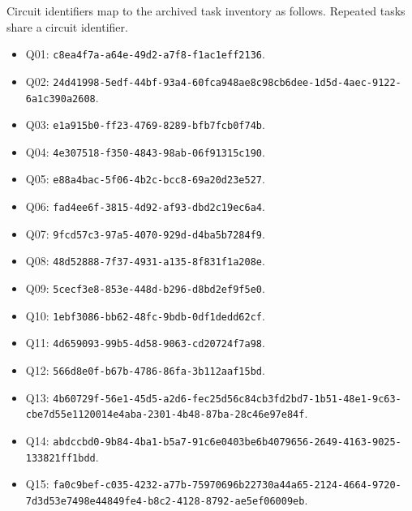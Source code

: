 Circuit identifiers map to the archived task inventory as follows. Repeated tasks share a circuit identifier.
\begin{itemize}

\item Q01: \texttt{c8ea4f7a-a64e-49d2-a7f8-f1ac1eff2136}.

\item Q02: \texttt{24d41998-5edf-44bf-93a4-60fca948ae8c}\newline \texttt{98cb6dee-1d5d-4aec-9122-6a1c390a2608}.

\item Q03: \texttt{e1a915b0-ff23-4769-8289-bfb7fcb0f74b}.

\item Q04: \texttt{4e307518-f350-4843-98ab-06f91315c190}.

\item Q05: \texttt{e88a4bac-5f06-4b2c-bcc8-69a20d23e527}.

\item Q06: \texttt{fad4ee6f-3815-4d92-af93-dbd2c19ec6a4}.

\item Q07: \texttt{9fcd57c3-97a5-4070-929d-d4ba5b7284f9}.

\item Q08: \texttt{48d52888-7f37-4931-a135-8f831f1a208e}.

\item Q09: \texttt{5cecf3e8-853e-448d-b296-d8bd2ef9f5e0}.

\item Q10: \texttt{1ebf3086-bb62-48fc-9bdb-0df1dedd62cf}.

\item Q11: \texttt{4d659093-99b5-4d58-9063-cd20724f7a98}.

\item Q12: \texttt{566d8e0f-b67b-4786-86fa-3b112aaf15bd}.

\item Q13: \texttt{4b60729f-56e1-45d5-a2d6-fec25d56c84c}\newline \texttt{b3fd2bd7-1b51-48e1-9c63-cbe7d55e1120}\newline \texttt{014e4aba-2301-4b48-87ba-28c46e97e84f}.

\item Q14: \texttt{abdccbd0-9b84-4ba1-b5a7-91c6e0403be6}\newline \texttt{b4079656-2649-4163-9025-133821ff1bdd}.

\item Q15: \texttt{fa0c9bef-c035-4232-a77b-75970696b227}\newline \texttt{30a44a65-2124-4664-9720-7d3d53e7498e}\newline \texttt{44849fe4-b8c2-4128-8792-ae5ef06009eb}.


\end{itemize}
